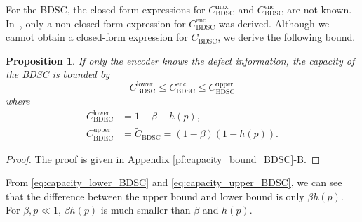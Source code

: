 \documentclass[10pt,twocolumn,twoside,submit]{JCNtran}
\newtheorem{proposition}[theorem]{Proposition}
\begin{document}
	For the BDSC, the closed-form expressions for $C_\text{BDSC}^{\text{max}}$ and $C_\text{BDSC}^{\text{enc}}$ are not known. In~\cite{Heegard1983plbc}, only a non-closed-form expression for $C_\text{BDSC}^{\text{enc}}$ was derived. Although we cannot obtain a closed-form expression for $C_\text{BDSC}$, we derive the following bound. 	
	\begin{proposition} \label{thm:capacity_bound_BDSC}
		If only the encoder knows the defect information, the capacity of the BDSC is bounded by
		\begin{equation} \label{eq:capacity_bound_BDSC}
			C_{\text{BDSC}}^{\text{lower}} \le C_{\text{BDSC}}^{\text{enc}} \le C_{\text{BDSC}}^{\text{upper}}			 
		\end{equation}
		where 
		\begin{align} 
			C_{\text{BDEC}}^{\text{lower}} &= 1 - \beta - h(p), \label{eq:capacity_lower_BDSC} \\
            C_{\text{BDEC}}^{\text{upper}} &= \widetilde{C}_{\text{BDSC}} = (1 - \beta)(1 - h(p)). \label{eq:capacity_upper_BDSC} 
		\end{align}		
	\end{proposition}
	\begin{proof}
		The proof is given in Appendix \ref{pf:capacity_bound_BDSC}-B.
	\end{proof}	
	From \eqref{eq:capacity_lower_BDSC} and \eqref{eq:capacity_upper_BDSC}, we can see that the difference between the upper bound and lower bound is only $\beta h(p)$. For $\beta, p \ll 1$, $\beta h(p)$ is much smaller than $\beta$ and $h(p)$. 	
	
\end{document}
